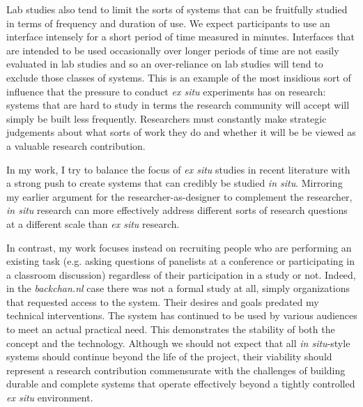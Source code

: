Lab studies also tend to limit the sorts of systems that can be fruitfully studied in terms of frequency and duration of use. We expect participants to use an interface intensely for a short period of time measured in minutes. Interfaces that are intended to be used occasionally over longer periods of time are not easily evaluated in lab studies and so an over-reliance on lab studies will tend to exclude those classes of systems. This is an example of the most insidious sort of influence that the pressure to conduct \emph{ex situ} experiments has on research: systems that are hard to study in terms the research community will accept will simply be built less frequently. Researchers must constantly make strategic judgements about what sorts of work they do and whether it will be be viewed as a valuable research contribution. 

In my work, I try to balance the focus of \emph{ex situ} studies in recent literature with a strong push to create systems that can credibly be studied \emph{in situ}. Mirroring my earlier argument for the researcher-as-designer to complement the researcher, \emph{in situ} research can more effectively address different sorts of research questions at a different scale than \emph{ex situ} research.





In contrast, my work focuses instead on recruiting people who are performing an existing task (e.g. asking questions of panelists at a conference or participating in a classroom discussion) regardless of their participation in a study or not. Indeed, in the \emph{backchan.nl} case there was not a formal study at all, simply organizations that requested access to the system. Their desires and goals predated my technical interventions. The system has continued to be used by various audiences to meet an actual practical need. This demonstrates the stability of both the concept and the technology. Although we should not expect that all \emph{in situ}-style systems should continue beyond the life of the project, their viability should represent a research contribution commensurate with the challenges of building durable and complete systems that operate effectively beyond a tightly controlled \emph{ex situ} environment.


